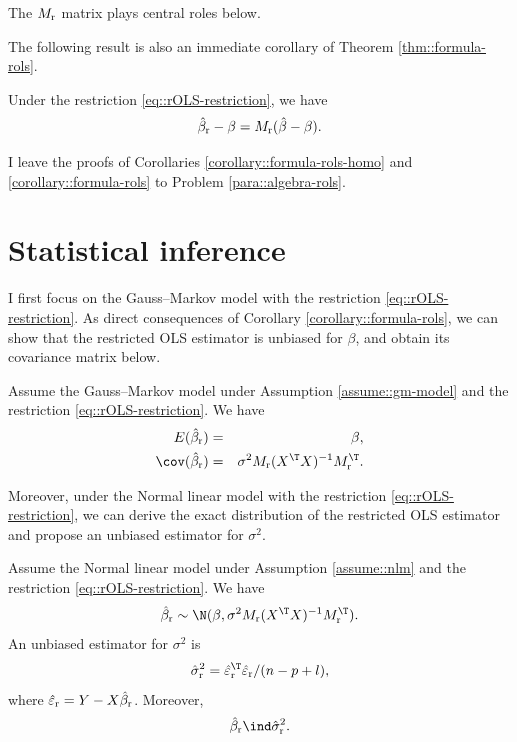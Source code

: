 The $M_\textup{r} $ matrix plays central roles below.





 
 
 The following result is also an immediate corollary of Theorem \ref{thm::formula-rols}. 
 
 \begin{corollary}
 \label{corollary::formula-rols}
 Under the restriction \eqref{eq::rOLS-restriction}, we have 
 $$
 \hat{\beta}_\textup{r} - \beta = M_\textup{r} ( \hat{\beta} - \beta  ) . 
 $$
 \end{corollary}
 
 
 I leave the proofs of Corollaries \ref{corollary::formula-rols-homo} and \ref{corollary::formula-rols} to Problem \ref{para::algebra-rols}. 
 
 
 \section{Statistical inference}\label{sec::stat-inf-rols}

I first focus on the Gauss--Markov model with the restriction \eqref{eq::rOLS-restriction}.  As direct consequences of Corollary \ref{corollary::formula-rols}, we can show that the restricted OLS estimator is unbiased for $\beta$, and obtain its covariance matrix below. 



\begin{corollary}
\label{corollary::moments-rols}
Assume the Gauss--Markov model under Assumption \ref{assume::gm-model} and the restriction \eqref{eq::rOLS-restriction}. We have 
\begin{eqnarray*}
E (\hat{\beta}_\textup{r}  )  & = & \beta    ,\\ 
\cov(  \hat{\beta}_\textup{r}  ) & = &
\sigma^2 M_\textup{r} (X^{\T}X)^{-1} M_\textup{r}^{\T}.
\end{eqnarray*}
\end{corollary}



Moreover, under the Normal linear model with the restriction \eqref{eq::rOLS-restriction}, we can derive the exact distribution of the restricted OLS estimator and propose an unbiased estimator for $\sigma^2$. 


\begin{theorem}
\label{thm::distribution-normal-rols}
Assume the Normal linear model under Assumption \ref{assume::nlm} and the restriction \eqref{eq::rOLS-restriction}. We have 
$$
\hat{\beta}_\textup{r}  \sim \N (  \beta ,  \sigma^2 M_\textup{r} (X^{\T}X)^{-1} M_\textup{r}^{\T}). 
$$
An unbiased estimator for $\sigma^2$ is
$$
\hat{\sigma}^2_\textup{r} = \hat{\varepsilon}_\textup{r} ^{\T} \hat{\varepsilon}_\textup{r}  / (n-p+l),
$$
where $\hat{\varepsilon}_\textup{r}  =  Y - X \hat{\beta}_\textup{r} $. Moreover, 
$$
\hat{\beta}_\textup{r}   \ind \hat{\sigma}^2_\textup{r} .
$$
\end{theorem}

